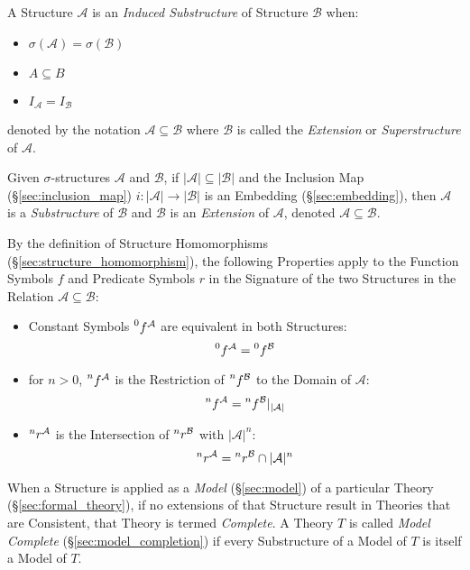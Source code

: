 A Structure $\mathcal{A}$ is an \emph{Induced Substructure} of
Structure $\mathcal{B}$ when:
\begin{itemize}
  \item $\sigma(\mathcal{A}) = \sigma(\mathcal{B})$
  \item $A \subseteq B$
  \item $I_{\mathcal{A}}=I_{\mathcal{B}}$
\end{itemize}
denoted by the notation $\mathcal{A} \subseteq \mathcal{B}$ where
$\mathcal{B}$ is called the \emph{Extension} or \emph{Superstructure}
of $\mathcal{A}$.

Given $\sigma$-structures $\mathcal{A}$ and $\mathcal{B}$, if
$|\mathcal{A}| \subseteq |\mathcal{B}|$ and the Inclusion Map
(\S\ref{sec:inclusion_map}) $i : |\mathcal{A}| \rightarrow
|\mathcal{B}|$ is an Embedding (\S\ref{sec:embedding}), then
$\mathcal{A}$ is a \emph{Substructure} of $\mathcal{B}$ and
$\mathcal{B}$ is an \emph{Extension} of $\mathcal{A}$, denoted
$\mathcal{A} \subseteq \mathcal{B}$.

By the definition of Structure Homomorphisms
(\S\ref{sec:structure_homomorphism}), the following Properties apply
to the Function Symbols $f$ and Predicate Symbols $r$ in the Signature
of the two Structures in the Relation $\mathcal{A} \subseteq
\mathcal{B}$:
\begin{itemize}
  \item Constant Symbols $\prescript{0}{}{f}^\mathcal{A}$ are
    equivalent in both Structures:
    \[
      \prescript{0}{}{f}^\mathcal{A} = \prescript{0}{}{f}^\mathcal{B}
    \]
  \item for $n >0$, $\prescript{n}{}{f}^\mathcal{A}$ is the
    Restriction of $\prescript{n}{}{f}^\mathcal{B}$ to the Domain of
    $\mathcal{A}$:
    \[
      \prescript{n}{}{f}^\mathcal{A}
      = \prescript{n}{}{f}^\mathcal{B} |_{|\mathcal{A}|}
    \]
  \item $\prescript{n}{}{r}^\mathcal{A}$ is the Intersection of
    $\prescript{n}{}{r}^\mathcal{B}$ with $|\mathcal{A}|^n$:
    \[
      \prescript{n}{}{r}^\mathcal{A}
      = \prescript{n}{}{r}^\mathcal{B} \cap |\mathcal{A}|^n
    \]
\end{itemize}



When a Structure is applied as a \emph{Model} (\S\ref{sec:model}) of a
particular Theory (\S\ref{sec:formal_theory}), if no extensions of
that Structure result in Theories that are Consistent, that Theory is
termed \emph{Complete}. A Theory $T$ is called \emph{Model Complete}
(\S\ref{sec:model_completion}) if every Substructure of a Model of $T$
is itself a Model of $T$.

